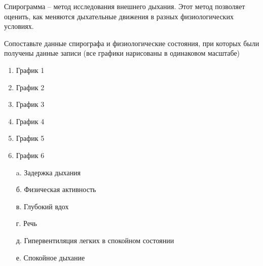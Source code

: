 
Спирограмма – метод исследования внешнего дыхания. Этот
метод позволяет оценить, как меняются дыхательные движения в разных
физиологических условиях.


Сопоставьте данные спирографа и физиологические состояния, при которых были получены данные записи (все графики нарисованы в одинаковом масштабе)

\begin{multicols}{2}
{
\begin{enumerate}
    \item График 1 
    \item График 2
    \item График 3
    \item График 4
    \item График 5
    \item График 6
\end{enumerate}
}
{
    \begin{enumerate}
        \item[a.] Задержка дыхания
        \item[б.] Физическая активность
        \item[в.] Глубокий вдох
        \item[г.] Речь
        \item[д.] Гипервентиляция легких в спокойном состоянии
        \item[е.] Спокойное дыхание     
    \end{enumerate}
}

\end{multicols}

\explanationSection

